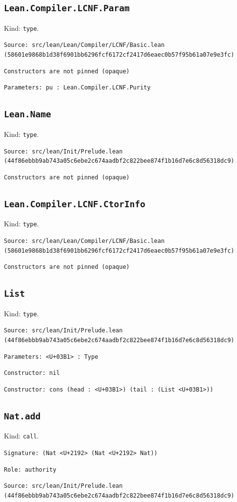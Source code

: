 \documentclass[11pt]{article}
\begin{document}
\subsection*{\texttt{Lean.Compiler.LCNF.Param}}
\noindent Kind: \texttt{type}.\par
\noindent \texttt{Source: src/lean/Lean/Compiler/LCNF/Basic.lean (58601e9868b1d38f6901bb6296fcf6172cf2417d6eaec0b57f95b61a07e9e3fc)}\par
\noindent \texttt{Constructors are not pinned (opaque)}\par
\noindent \texttt{Parameters: pu : Lean.Compiler.LCNF.Purity}\par
\subsection*{\texttt{Lean.Name}}
\noindent Kind: \texttt{type}.\par
\noindent \texttt{Source: src/lean/Init/Prelude.lean (44f86ebbb9ab743a05c6ebe2c674aadbf2c822bee874f1b16d7e6c8d56318dc9)}\par
\noindent \texttt{Constructors are not pinned (opaque)}\par
\subsection*{\texttt{Lean.Compiler.LCNF.CtorInfo}}
\noindent Kind: \texttt{type}.\par
\noindent \texttt{Source: src/lean/Lean/Compiler/LCNF/Basic.lean (58601e9868b1d38f6901bb6296fcf6172cf2417d6eaec0b57f95b61a07e9e3fc)}\par
\noindent \texttt{Constructors are not pinned (opaque)}\par
\subsection*{\texttt{List}}
\noindent Kind: \texttt{type}.\par
\noindent \texttt{Source: src/lean/Init/Prelude.lean (44f86ebbb9ab743a05c6ebe2c674aadbf2c822bee874f1b16d7e6c8d56318dc9)}\par
\noindent \texttt{Parameters: <U+03B1> : Type}\par
\noindent \texttt{Constructor: nil }\par
\noindent \texttt{Constructor: cons (head : <U+03B1>) (tail : (List <U+03B1>))}\par
\subsection*{\texttt{Nat.add}}
\noindent Kind: \texttt{call}.\par
\noindent \texttt{Signature: (Nat <U+2192> (Nat <U+2192> Nat))}\par
\noindent \texttt{Role: authority}\par
\noindent \texttt{Source: src/lean/Init/Prelude.lean (44f86ebbb9ab743a05c6ebe2c674aadbf2c822bee874f1b16d7e6c8d56318dc9)}\par
\end{document}
